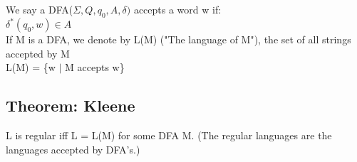 \documentclass[12pt]{article}
\begin{document}
	We say a DFA($\Sigma, Q, q_0, A, \delta)$ accepts a word w if:\\
	$\delta^*(q_0, w) \in A$\\
	
	If M is a DFA, we denote by L(M) ("The language of M"), the set of all strings accepted by M\\
	L(M) = \{w $|$ M accepts w\}\\
	
	\subsection*{Theorem: Kleene}
	L is regular iff L = L(M) for some DFA M. (The regular languages are the languages accepted by DFA's.)\\
	
	
	
	
	
\end{document}
